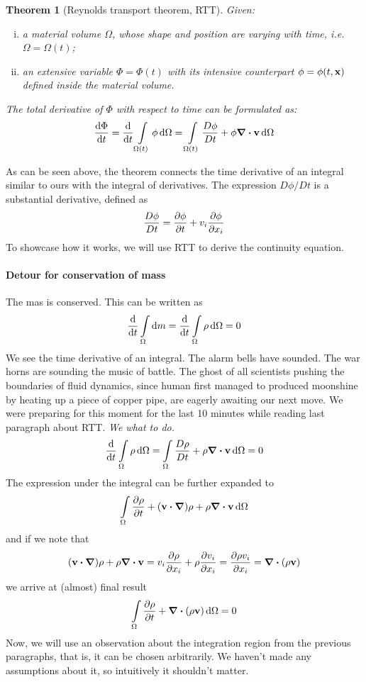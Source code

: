 \documentclass[a4paper]{article}
\newtheorem{theorem}{Theorem}
\begin{document}
\begin{theorem}[Reynolds transport theorem, RTT]
  Given:
  \begin{enumerate}[(i)]
    \item a material volume \(\Omega\), whose shape and position are varying with time,
      i.e.\ \(\Omega = \Omega(t)\);
    \item an extensive variable \(\Phi = \Phi(t)\) with its intensive counterpart 
      \(\phi = \phi(t, \vb{x})\)  defined inside the material volume.
  \end{enumerate}
	The total derivative of \(\Phi\) with respect to time can be formulated as:
  \begin{equation}
    \dv{\Phi}{t} = \dv{t} \int\limits_{\Omega(t)} \phi \dd{\Omega}
    = \int\limits_{\Omega(t)} \dfrac{D\phi}{Dt} + \phi \div{\vb{v}} \dd{\Omega}
  \end{equation}
\end{theorem}

As can be seen above, the theorem connects the time derivative of an integral
similar to ours with the integral of derivatives. The expression \(D\phi/Dt\)
is a substantial derivative, defined as
\[
  \dfrac{D\phi}{Dt} = \pdv{\phi}{t} + v_i\pdv{\phi}{x_i}
\]
To showcase how it works, we will use RTT to derive the continuity equation.

\paragraph{Detour for conservation of mass}
The mas is conserved. This can be written as 
\[
  \dv{t}\int\limits_\Omega \dd{m} = 
  \dv{t}\int\limits_\Omega \rho\dd{\Omega} = 0
\]
We see the time derivative of an integral. The alarm bells have sounded. 
The war horns are sounding the music of battle. The ghost of all scientists
pushing the boundaries of fluid dynamics, since human first managed to produced
moonshine by heating up a piece of copper pipe, are eagerly awaiting our next 
move. We were preparing for this moment
for the last 10 minutes while reading last paragraph about RTT. 
\emph{We what to do.}
\[
  \dv{t}\int\limits_\Omega \rho\dd{\Omega} = 
  \int\limits_\Omega  \dfrac{D\rho}{Dt} + \rho\div{\vb{v}}\dd{\Omega}
  =  0
\]
The expression under the integral can be further expanded to
\[
  \int\limits_\Omega  \pdv{\rho}{t} + (\vb{v}\dotproduct\grad)\rho  
  + \rho\div{\vb{v}}\dd{\Omega}
\]
and if we note that 
\[
  (\vb{v}\dotproduct\grad)\rho + \rho\div{\vb{v}} = 
  v_i \pdv{\rho}{x_i} + \rho\pdv{v_i}{x_i} = \pdv{\rho v_i}{x_i}
  = \div{(\rho \vb{v})}
\]
we arrive at (almost) final result
\[
  \int\limits_\Omega  \pdv{\rho}{t} + \div{(\rho \vb{v})}\dd{\Omega} = 0
\]
Now, we will use an observation about the integration region from the 
previous paragraphs, that is, it can be chosen arbitrarily. We haven't
made any assumptions about it, so intuitively it shouldn't matter. 
\end{document}
